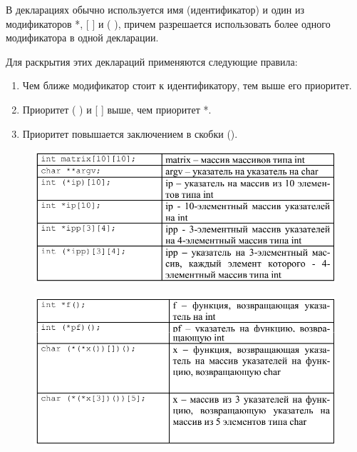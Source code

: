 \documentclass{beamer}
\begin{document}
\begin{frame}
В декларациях обычно используется имя (идентификатор) и один из модификаторов *, [ ] и ( ), причем разрешается использовать более одного модификатора в одной декларации. 

Для раскрытия этих деклараций применяются следующие правила:
\begin{enumerate}
\item Чем ближе модификатор стоит к идентификатору, тем выше его приоритет.
\item Приоритет ( ) и [ ] выше, чем приоритет *.
\item Приоритет повышается заключением в скобки ().
\end{enumerate}
\begin{figure}[h]
\centering
\includegraphics[scale=0.5]{images/lec04-pic04.png}
\end{figure}
\end{frame}

\begin{frame}
\begin{figure}[h]
\centering
\includegraphics[scale=0.5]{images/lec04-pic05.png}
\end{figure}
\end{frame}
\end{document}
